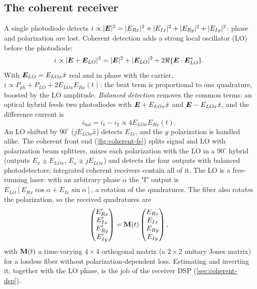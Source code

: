 \subsection{The coherent receiver}
A single photodiode detects $i\propto|\bm{E}|^2=|E_{Rx}|^2+|E_{Ix}|^2+|E_{Ry}|^2+|E_{Iy}|^2$: phase and polarization are
lost. Coherent detection adds a strong local oscillator (LO) before the photodiode:
\begin{equation}
  i\propto|\bm{E}+\bm{E}_{LO}|^2=|\bm{E}|^2+|\bm{E}_{LO}|^2+2\Re\{\bm{E}\cdot\bm{E}_{LO}^*\}.
\end{equation}
With $\bm{E}_{LO}=E_{LOx}\hat x$ real and in phase with the carrier,
$i\propto P_{ph}+P_{LO}+2E_{LOx}E_{Rx}(t)$: the beat term is proportional to one quadrature, boosted by the LO
amplitude. \emph{Balanced detection} removes the common terms: an optical hybrid feeds two photodiodes
with $\bm{E}+E_{LOx}\hat x$ and $\bm{E}-E_{LOx}\hat x$, and the difference current is
\begin{equation}
  i_{\mathrm{bal}}=i_1-i_2\propto4E_{LOx}E_{Rx}(t).
\end{equation}
An LO shifted by $90^\circ$ ($jE_{LOx}\hat x$) detects $E_{Ix}$, and the $y$ polarization is handled alike. The
coherent front end (\cref{fig:coherent-fe}) splits signal and LO with polarization beam splitters,
mixes each polarization with the LO in a $90^\circ$ hybrid (outputs $E_x\pm E_{LOx}$, $E_x\pm jE_{LOx}$) and
detects the four outputs with balanced photodetectors; integrated coherent receivers contain all of
it. The LO is a free-running laser: with an arbitrary phase $\alpha$ the "I" output is
$E_{LO}[E_{Rx}\cos\alpha+E_{Ix}\sin\alpha]$, a rotation of the quadratures. The fiber also rotates the
polarization, so the received quadratures are
\begin{equation}
  \begin{pmatrix}E'_{Rx}\\E'_{Ix}\\E'_{Ry}\\E'_{Iy}\end{pmatrix}=\mathbf{M}(t)\begin{pmatrix}E_{Rx}\\E_{Ix}\\E_{Ry}\\E_{Iy}\end{pmatrix},
\end{equation}
with $\mathbf{M}(t)$ a time-varying $4\times4$ orthogonal matrix (a $2\times2$ unitary Jones matrix) for a lossless
fiber without polarization-dependent loss. Estimating and inverting it, together with the LO
phase, is the job of the receiver DSP (\cref{sec:coherent-dsp}).

